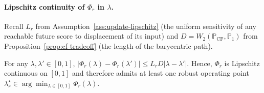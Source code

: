 
\paragraph{Lipschitz continuity of $\Phi_r$ in $\lambda$.} Recall $L_r$ from Assumption~\ref{ass:update-lipschitz} (the uniform sensitivity of any reachable future score to displacement of its input) and $D=W_2(\mathbb P_{\mathrm{CF}},\mathbb P_1)$ from Proposition~\ref{prop:cf-tradeoff} (the length of the barycentric path).
\begin{proposition}
For any $\lambda,\lambda'\in[0,1]$,
\(
\left|
\Phi_r(\lambda)
-
\Phi_r(\lambda')
\right|
\le
L_r D
|\lambda-\lambda'|.
\)
Hence, $\Phi_r$ is Lipschitz continuous on $[0,1]$ and therefore admits
at least one robust operating point
$
\lambda_r^\star
\in
\arg\min_{\lambda\in[0,1]}
\Phi_r(\lambda).
$
\end{proposition}

